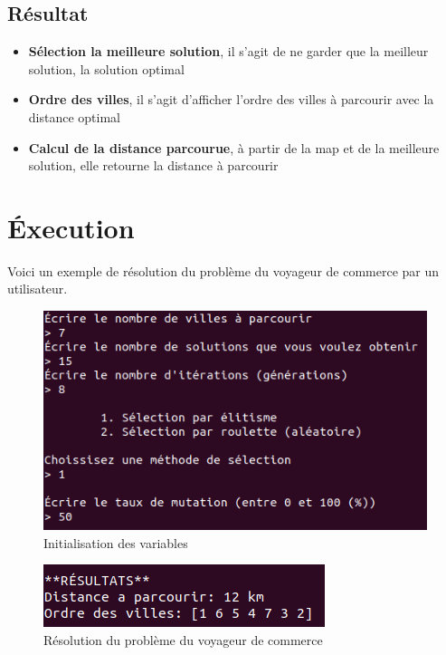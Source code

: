 \documentclass[12pt]{report}
\begin{document}
\subsection{Résultat}
\begin{itemize}
 \item \textbf{Sélection la meilleure solution}, il s'agit de ne garder que la meilleur solution, la solution optimal
 \item \textbf{Ordre des villes}, il s'agit d'afficher l'ordre des villes à parcourir avec la distance optimal
 \item \textbf{Calcul de la distance parcourue}, à partir de la map et de la meilleure solution, elle retourne la distance à parcourir
\end{itemize}

\section{Éxecution}
Voici un exemple de résolution du problème du voyageur de commerce par un utilisateur.\\

\begin{figure}[H]
\centering
\includegraphics[scale=0.85]{img/initialization}
\caption{Initialisation des variables}
\end{figure}

\begin{figure}[H]
\centering
\includegraphics[scale=1]{img/results}
\caption{Résolution du problème du voyageur de commerce}
\end{figure}
 
\end{document}
